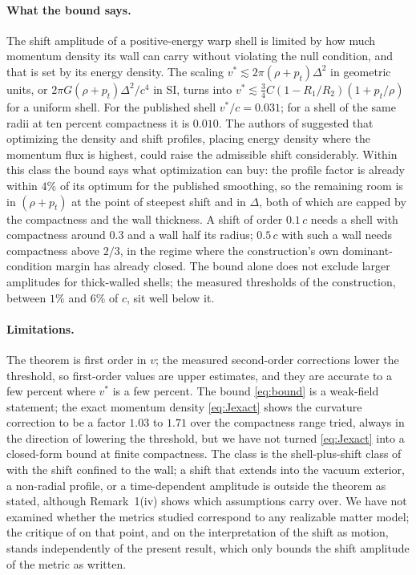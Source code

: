 \documentclass[11pt,a4paper]{article}
\theoremstyle{remark}
\begin{document}
\paragraph{What the bound says.} The shift amplitude of a positive-energy warp shell is limited by how much momentum density its wall can carry without violating the null condition, and that is set by its energy density. The scaling $v^* \lesssim 2\pi(\rho+p_t)\Delta^2$ in geometric units, or $2\pi G(\rho+p_t)\Delta^2/c^4$ in SI, turns into $v^* \lesssim \tfrac34 C(1-R_1/R_2)(1+p_t/\rho)$ for a uniform shell. For the published shell $v^*/c = 0.031$; for a shell of the same radii at ten percent compactness it is $0.010$. The authors of \cite{Fuchs2024} suggested that optimizing the density and shift profiles, placing energy density where the momentum flux is highest, could raise the admissible shift considerably. Within this class the bound says what optimization can buy: the profile factor is already within $4\%$ of its optimum for the published smoothing, so the remaining room is in $(\rho+p_t)$ at the point of steepest shift and in $\Delta$, both of which are capped by the compactness and the wall thickness. A shift of order $0.1\,c$ needs a shell with compactness around $0.3$ and a wall half its radius; $0.5\,c$ with such a wall needs compactness above $2/3$, in the regime where the construction's own dominant-condition margin has already closed. The bound alone does not exclude larger amplitudes for thick-walled shells; the measured thresholds of the construction, between $1\%$ and $6\%$ of $c$, sit well below it.

\paragraph{Limitations.} The theorem is first order in $v$; the measured second-order corrections lower the threshold, so first-order values are upper estimates, and they are accurate to a few percent where $v^*$ is a few percent. The bound \eqref{eq:bound} is a weak-field statement; the exact momentum density \eqref{eq:Jexact} shows the curvature correction to be a factor $1.03$ to $1.71$ over the compactness range tried, always in the direction of lowering the threshold, but we have not turned \eqref{eq:Jexact} into a closed-form bound at finite compactness. The class is the shell-plus-shift class of \cite{Fuchs2024} with the shift confined to the wall; a shift that extends into the vacuum exterior, a non-radial profile, or a time-dependent amplitude is outside the theorem as stated, although Remark~1(iv) shows which assumptions carry over. We have not examined whether the metrics studied correspond to any realizable matter model; the critique of \cite{Barzegar2026} on that point, and on the interpretation of the shift as motion, stands independently of the present result, which only bounds the shift amplitude of the metric as written.
\end{document}

